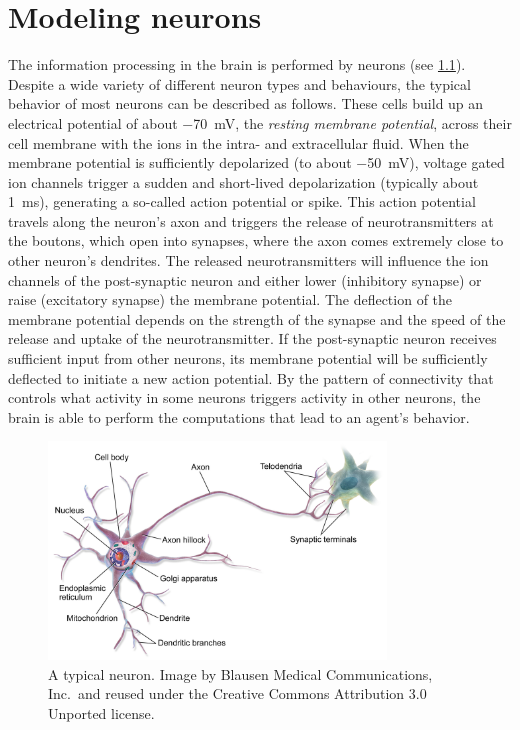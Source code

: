 \chapter{Modeling neurons}\label{sec:neurons}
The information processing in the brain is performed by neurons (see \cref{fig:neuron}).
Despite a wide variety of different neuron types and behaviours, the typical behavior of most neurons can be described as follows.
These cells build up an electrical potential of about \SI{-70}{\milli\volt}, the \emph{resting membrane potential}, across their cell membrane with the ions in the intra- and extracellular fluid.
When the membrane potential is sufficiently depolarized (to about \SI{-50}{\milli\volt}), voltage gated ion channels trigger a sudden and short-lived depolarization (typically about \SI{1}{\milli\second}), generating a so-called action potential or spike.
This action potential travels along the neuron's axon and triggers the release of neurotransmitters at the boutons, which open into synapses, where the axon comes extremely close to other neuron's dendrites.
The released neurotransmitters will influence the ion channels of the post-synaptic neuron and either lower (inhibitory synapse) or raise (excitatory synapse) the membrane potential.
The deflection of the membrane potential depends on the strength of the synapse and the speed of the release and uptake of the neurotransmitter.
If the post-synaptic neuron receives sufficient input from other neurons, its membrane potential will be sufficiently deflected to initiate a new action potential.
By the pattern of connectivity that controls what activity in some neurons triggers activity in other neurons, the brain is able to perform the computations that lead to an agent's behavior.

\begin{figure}
    \centering
    \includegraphics[width=0.8\textwidth]{figures/Blausen_0657_MultipolarNeuron}
    \caption[A typical neuron.]{A typical neuron. Image by Blausen Medical Communications, Inc.\ and reused under the Creative Commons Attribution 3.0 Unported license.}\label{fig:neuron}
\end{figure}

